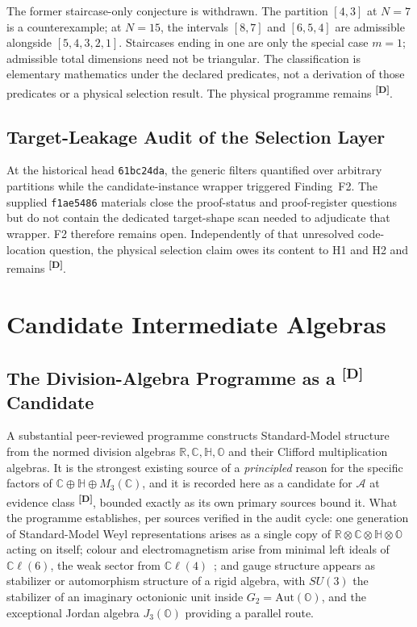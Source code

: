 \documentclass[12pt,a4paper,twoside]{article}
\theoremstyle{plain}
\theoremstyle{definition}
\theoremstyle{remark}
\newcommand{\catmark}[1]{\textsuperscript{\textsf{\textbf{[#1]}}}}
\begin{document}
The former staircase-only conjecture is withdrawn. The partition $[4,3]$
at $N=7$ is a counterexample; at $N=15$, the intervals $[8,7]$ and $[6,5,4]$
are admissible alongside $[5,4,3,2,1]$. Staircases ending in one are only the
special case $m=1$; admissible total dimensions need not be triangular.
The classification is elementary mathematics under the declared predicates,
not a derivation of those predicates or a physical selection result.
The physical programme remains \catmark{D}.

\subsection{Target-Leakage Audit of the Selection Layer}
\label{subsec:selection-leakage}

At the historical head \texttt{61bc24da}, the generic filters quantified over
arbitrary partitions while the candidate-instance wrapper triggered Finding~F2.
The supplied \texttt{f1ae5486} materials close the proof-status and
proof-register questions but do not contain the dedicated target-shape scan
needed to adjudicate that wrapper. F2 therefore remains open. Independently of
that unresolved code-location question, the physical selection claim owes its
content to H1 and H2 and remains \catmark{D}.

\newpage
\section{Candidate Intermediate Algebras}
\label{sec:candidates}

\subsection{The Division-Algebra Programme as a \catmark{D} Candidate}
\label{subsec:division-algebra}

A substantial peer-reviewed programme constructs Standard-Model structure
from the normed division algebras $\mathbb R, \mathbb C, \mathbb H,
\mathbb O$ and their Clifford multiplication algebras. It is the
strongest existing source of a \emph{principled} reason for the specific
factors of $\mathbb C \oplus \mathbb H \oplus M_3(\mathbb C)$, and it is
recorded here as a candidate for $\mathcal A$ at evidence class
\catmark{D}, bounded exactly as its own primary sources bound it. What
the programme establishes, per sources verified in the audit cycle: one
generation of Standard-Model Weyl representations arises as a single copy
of $\mathbb R \otimes \mathbb C \otimes \mathbb H \otimes \mathbb O$
acting on itself; colour and electromagnetism arise from minimal left
ideals of $\mathbb C\ell(6)$, the weak sector from $\mathbb C\ell(4)$~\cite{furey2018};
and gauge structure appears as stabilizer or automorphism structure of a
rigid algebra, with $SU(3)$ the stabilizer of an imaginary octonionic
unit inside $G_2 = \mathrm{Aut}(\mathbb O)$, and the exceptional Jordan
algebra $J_3(\mathbb O)$ providing a parallel route.
\end{document}
